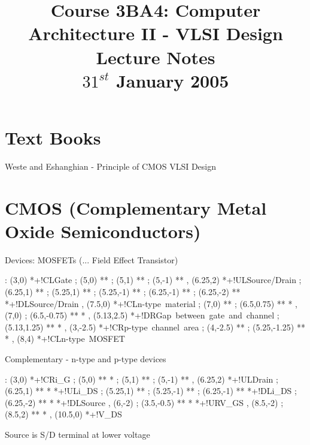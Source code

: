 \documentclass[a4paper,12pt]{article}
\begin{document}
\title{Course 3BA4: Computer Architecture II - VLSI Design \\ Lecture Notes \\ $31^{st}$ January 2005}

\maketitle

\section*{Text Books}

Weste and Eshanghian - Principle of CMOS VLSI Design


\section*{CMOS (Complementary Metal Oxide Semiconductors)}

Devices: MOSFETs (... Field Effect Transistor)

\begin{table}[h]

\xy <1cm,0cm>:
(3,0) *+!CL{Gate} ; (5,0) **\dir{-} ;
(5,1) **\dir{-} ; (5,-1) **\dir{-} ,
(6.25,2) *+!UL{Source/Drain} ; (6.25,1) **\dir{-} ;
(5.25,1) **\dir{-} ;
(5.25,-1) **\dir{-} ;
(6.25,-1) **\dir{-} ;
(6.25,-2) **\dir{-} *+!DL{Source/Drain} ,
(7.5,0) *+!CL{\mbox{n-type material}} ; (7,0) **\dir{--} ;
(6.5,0.75) **\dir{--} *\dir{>} ,
(7,0) ; (6.5,-0.75) **\dir{--} *\dir{>} ,
(5.13,2.5) *+!DR{\mbox{Gap between gate and channel}} ; 
(5.13,1.25) **\dir{--} *\dir{>} ,
(3,-2.5) *+!CR{\mbox{p-type channel area}} ; (4,-2.5) **\dir{--} ;
(5.25,-1.25) **\dir{--} *\dir{>} ,
(8,4) *+!CL{\mbox{n-type MOSFET}}
\endxy

\caption{Complementary - n-type and p-type devices}

\end{table}

\begin{table}[h]

\xy <1cm,0cm>:
(3,0) *+!CR{i_{G}  } ; (5,0) **\dir{-} *\dir{>} ;
(5,1) **\dir{-} ; (5,-1) **\dir{-} ,
(6.25,2) *+!UL{Drain} ; 
(6.25,1) **\dir{-} *\dir{>} *+!UL{i_{DS}} ;
(5.25,1) **\dir{-} ;
(5.25,-1) **\dir{-} ;
(6.25,-1) **\dir{-} *+!DL{i_{DS}} ;
(6.25,-2) **\dir{-} *\dir{>} *+!DL{Source} ,
(6,-2) ; (3.5,-0.5) ** *\dir{<} *+!UR{V_{GS}} ,
(8.5,-2) ; (8.5,2) ** *\dir{>} ,
(10.5,0) *+!{V_{DS} }
\endxy

\caption{Source is S/D terminal at lower voltage}

\end{table}
\end{document}
